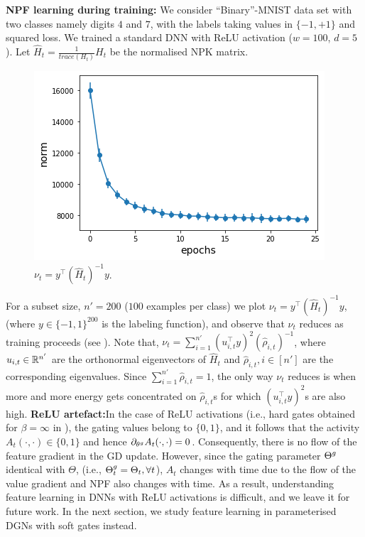 \textbf{NPF learning during training:} We consider ``Binary''-MNIST data set with two classes namely digits $4$ and $7$, with the labels taking values in $\{-1,+1\}$ and squared loss. We trained a standard DNN with ReLU activation ($w=100$, $d=5$). Let $\widehat{H}_t=\frac{1}{trace(H_t)}H_t$ be the normalised NPK matrix. 
\begin{figure}
\includegraphics[scale=0.25]{figs/path-gram.png}
\caption{\label{fig:gen}$\nu_t=y^\top (\widehat{H}_t)^{-1} y$.}
\end{figure}
For a subset size, $n'=200$ ($100$ examples per class) we plot $\nu_t=y^\top (\widehat{H}_t)^{-1} y$, (where $y\in\{-1,1\}^{200}$ is the labeling function), and observe that $\nu_t$ reduces as training proceeds (see ). Note that, $\nu_t=\sum_{i=1}^{n'}(u_{i,t}^\top y)^2 (\hat{\rho}_{i,t})^{-1}$, where $u_{i,t}\in \mathbb{R}^{n'}$ are the orthonormal eigenvectors of $\widehat{H}_t$ and $\hat{\rho}_{i,t},i\in[n']$ are the corresponding eigenvalues. Since $\sum_{i=1}^{n'}\hat{\rho}_{i,t}=1$, the only way $\nu_t$ reduces is when more and more energy gets concentrated on $\hat{\rho}_{i,t}$s for which $(u_{i,t}^\top y)^2$s are also high.\WFclear%
\textbf{ReLU artefact:}In the case of ReLU activations (i.e., hard gates obtained for $\beta=\infty$ in ), the gating values belong to $\{0,1\}$, and it follows that the activity $A_t(\cdot,\cdot)\in\{0,1\}$ and hence $\partial_{\theta^g} A_t(\cdot,\cdot)=0$. Consequently, there is no flow of the feature gradient in the GD update. However, since the gating parameter ${\Theta}^g$ identical with $\Theta$, (i.e., ${\Theta}^g_t=\Theta_t,\forall t$), $A_t$ changes with time due to the flow of the value gradient and NPF also changes with time. As a result, understanding feature learning in DNNs with ReLU activations is difficult, and we leave it for future work. In the next section, we study feature learning in parameterised DGNs with soft gates instead.

